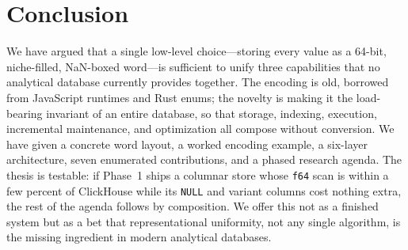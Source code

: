 \documentclass[10pt]{article}
\begin{document}
\section{Conclusion}
\label{sec:conclusion}

We have argued that a single low-level choice---storing every value as
a 64-bit, niche-filled, NaN-boxed word---is sufficient to unify three
capabilities that no analytical database currently provides together.
The encoding is old, borrowed from JavaScript runtimes and Rust enums;
the novelty is making it the load-bearing invariant of an entire
database, so that storage, indexing, execution, incremental
maintenance, and optimization all compose without conversion. We have
given a concrete word layout, a worked encoding example, a six-layer
architecture, seven enumerated contributions, and a phased research
agenda. The thesis is testable: if Phase~1 ships a columnar store whose
\texttt{f64} scan is within a few percent of ClickHouse while its
\texttt{NULL} and variant columns cost nothing extra, the rest of the
agenda follows by composition. We offer this not as a finished system
but as a bet that representational uniformity, not any single algorithm,
is the missing ingredient in modern analytical databases.
\end{document}
